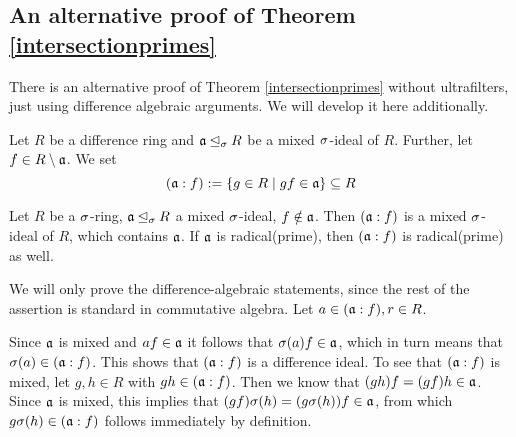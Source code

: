 \subsection{An alternative proof of Theorem \ref{intersectionprimes}}

There is an alternative proof of Theorem \ref{intersectionprimes} without ultrafilters, just using difference algebraic arguments. We will develop it here additionally.

\begin{defn}
Let $R$ be a difference ring and $\mathfrak{a} \unlhd_{\sigma} R$ be a mixed $\sigma$-ideal of $R$. Further, let $f \in R \setminus \mathfrak{a}$. We set $$(\mathfrak{a}:f):= \{ g \in R \mid gf \in \mathfrak{a} \} \subseteq R$$
\end{defn}

\begin{lem}\label{a:f}
Let $R$ be a $\sigma$-ring, $\mathfrak{a} \unlhd_{\sigma} R$ a mixed $\sigma$-ideal, $f \notin \mathfrak{a}$. Then $(\mathfrak{a}:f)$ is a mixed $\sigma$-ideal of $R$, which contains $\mathfrak{a}$. If $\mathfrak{a}$ is radical(prime), then $(\mathfrak{a}:f)$ is radical(prime) as well.
\begin{bew}
We will only prove the difference-algebraic statements, since the rest of the assertion is standard in commutative algebra.
Let $a \in (\mathfrak{a}:f), r \in R$. 

Since $\mathfrak{a}$ is mixed and $af \in \mathfrak{a}$ it follows that $\sigma(a)f \in \mathfrak{a}$, which in turn means that $\sigma(a) \in (\mathfrak{a}:f)$. This shows that $(\mathfrak{a}:f)$ is a difference ideal. 
To see that $(\mathfrak{a}:f)$ is mixed, let $g,h \in R$ with $gh \in (\mathfrak{a}:f)$. Then we know that $(gh)f = (gf)h  \in \mathfrak{a}$. Since $\mathfrak{a}$ is mixed, this implies that $(gf)\sigma(h) = (g\sigma(h))f \in \mathfrak{a}$, from which $g\sigma(h) \in (\mathfrak{a}:f)$ follows immediately by definition. \\



\end{bew}
\end{lem}
